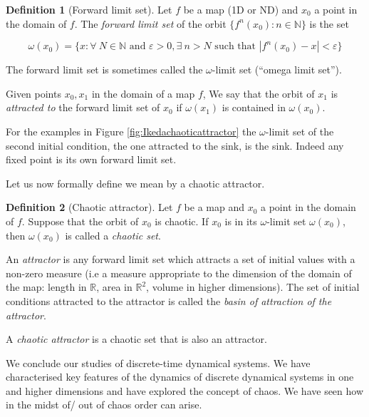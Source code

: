 \documentclass[
  a4paper,
  oneside,
  final]{krantz}
\newcommand{\R}{\mathbb{R}}
\newcommand{\N}{\mathbb{N}}
\renewcommand{\epsilon}{\varepsilon}
\theoremstyle{definition}
\newtheorem{definition}{Definition}[chapter]
\theoremstyle{definition}
\theoremstyle{definition}
\theoremstyle{definition}
\theoremstyle{remark}
\begin{document}
\begin{definition}[Forward limit set]
\protect\hypertarget{def:forward-limit-set}{}\label{def:forward-limit-set}Let \(f\) be a map (1D or ND) and \(x_0\) a point in the domain of \(f\). The \emph{forward limit set} of the orbit \(\{ f^{n}(x_0): n \in \N \}\) is the set

\[ \omega(x_0) = \{x: \forall \ N \in \N \text{ and } \epsilon >0, \exists \ n>N \text{ such that } |f^{n}(x_0) - x |< \epsilon \}\]
\end{definition}

The forward limit set is sometimes called the \(\omega\)-limit set (``omega limit set'').

Given points \(x_0, x_1\) in the domain of a map \(f\), We say that the orbit of \(x_1\) is \emph{attracted to} the forward limit set of \(x_0\) if \(\omega(x_1)\) is contained in \(\omega(x_0)\).

For the examples in Figure \ref{fig:Ikedachaoticattractor} the \(\omega\)-limit set of the second initial condition, the one attracted to the sink, is the sink. Indeed any fixed point is its own forward limit set.

Let us now formally define we mean by a chaotic attractor.

\begin{definition}[Chaotic attractor]
\protect\hypertarget{def:chaotic-attractor}{}\label{def:chaotic-attractor}Let \(f\) be a map and \(x_0\) a point in the domain of \(f\). Suppose that the orbit of \(x_0\) is chaotic. If \(x_0\) is in its \(\omega\)-limit set \(\omega(x_0)\), then \(\omega(x_0)\) is called a \emph{chaotic set}.

An \emph{attractor} is any forward limit set which attracts a set of initial values with a non-zero measure (i.e a measure appropriate to the dimension of the domain of the map: length in \(\R\), area in \(\R^2\), volume in higher dimensions). The set of initial conditions attracted to the attractor is called the \emph{basin of attraction of the attractor}.

A \emph{chaotic attractor} is a chaotic set that is also an attractor.
\end{definition}

We conclude our studies of discrete-time dynamical systems. We have characterised key features of the dynamics of discrete dynamical systems in one and higher dimensions and have explored the concept of chaos. We have seen how in the midst of/ out of chaos order can arise.
\end{document}
